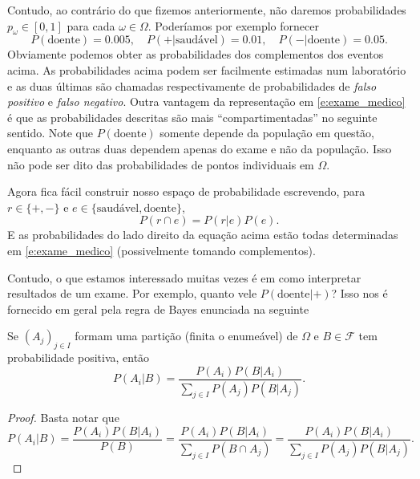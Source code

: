 Contudo, ao contrário do que fizemos anteriormente, não daremos probabilidades $p_\omega \in [0,1]$ para cada $\omega \in \Omega$.
Poderíamos por exemplo fornecer
\begin{equation}
  \label{e:exame_medico}
  P(\text{doente}) = 0.005, \quad P( + | \text{saudável}) = 0.01, \quad P( - | \text{doente}) = 0.05.
\end{equation}
Obviamente podemos obter as probabilidades dos complementos dos eventos acima.
As probabilidades acima podem ser facilmente estimadas num laboratório e as duas últimas são chamadas respectivamente de probabilidades de \emph{falso positivo} e \emph{falso negativo}.
Outra vantagem da representação em \eqref{e:exame_medico} é que as probabilidades descritas são mais ``compartimentadas'' no seguinte sentido.
Note que $P(\text{doente})$ somente depende da população em questão, enquanto as outras duas dependem apenas do exame e não da população.
Isso não pode ser dito das probabilidades de pontos individuais em $\Omega$.

Agora fica fácil construir nosso espaço de probabilidade escrevendo, para $r \in \{+, -\}$ e $e \in \{\text{saudável}, \text{doente}\}$,
\begin{equation}
  P(r \cap e) = P(r | e) P(e).
\end{equation}
E as probabilidades do lado direito da equação acima estão todas determinadas em \eqref{e:exame_medico} (possivelmente tomando complementos).

Contudo, o que estamos interessado muitas vezes é em como interpretar resultados de um exame.
Por exemplo, quanto vele $P(\text{doente} | +)$?
Isso nos é fornecido em geral pela regra de Bayes enunciada na seguinte

\begin{proposition}
  Se $(A_j)_{j\in I}$ formam uma partição (finita o enumeável) de $\Omega$ e $B \in \mathcal{F}$ tem probabilidade positiva, então
  \begin{equation}
    P(A_i | B) = \frac{P(A_i) P(B | A_i)}{\sum_{j\in I} P(A_j) P(B | A_j)}.
  \end{equation}
\end{proposition}

\begin{proof}
  Basta notar que
  \begin{equation}
    P(A_i | B) = \frac{P(A_i) P(B | A_i)}{P(B)} = \frac{P(A_i) P(B | A_i)}{\sum_{j\in I} P(B \cap A_j)} = \frac{P(A_i) P(B | A_i)}{\sum_{j\in I} P(A_j) P(B | A_j)}.
  \end{equation}
\end{proof}

